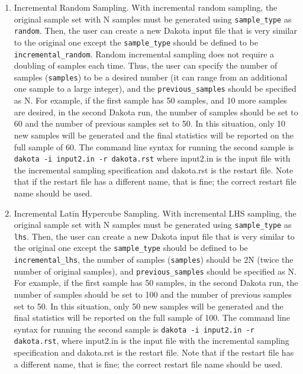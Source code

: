 \begin{enumerate}

\item Incremental Random Sampling. With incremental random sampling, 
the original sample set with N samples must be 
generated using \texttt{sample\_type} as \texttt{random}.
Then, the user can create a new Dakota input file that is very similar to the 
original one except the \texttt{sample\_type} should be defined to be 
\texttt{incremental\_random}. Random incremental sampling does not 
require a doubling of samples each time. Thus, the user 
can specify the number of samples (\texttt{samples}) to be a desired 
number (it can range from an additional one sample to a large integer), 
and the \texttt{previous\_samples} should be specified as N. For example, if
the first sample has 50 samples, and 10 more samples are desired, 
in the second Dakota run, the number
of samples should be set to 60 and the number of previous samples set
to 50. In this situation, only 10 new samples will be generated and
the final statistics will be reported on the full sample of 60. The
command line syntax for running the second sample is \texttt{dakota -i
input2.in -r dakota.rst} where input2.in is the input file with the
incremental sampling specification and dakota.rst is the restart file.
Note that if the restart file has a different name, that is fine; the
correct restart file name should be used.

\item Incremental Latin Hypercube Sampling. With incremental LHS sampling, 
the original sample set with N samples must be 
generated using \texttt{sample\_type} as \texttt{lhs}.
Then, the user can create a new Dakota input file that is very similar to the 
original one except the \texttt{sample\_type} should be defined to be 
\texttt{incremental\_lhs}, the number of samples (\texttt{samples}) should 
be 2N (twice the number of original samples), and
\texttt{previous\_samples} should be specified as N. For example, if
the first sample has 50 samples, in the second Dakota run, the number
of samples should be set to 100 and the number of previous samples set
to 50. In this situation, only 50 new samples will be generated and
the final statistics will be reported on the full sample of 100. The
command line syntax for running the second sample is \texttt{dakota -i
input2.in -r dakota.rst}, where input2.in is the input file with the
incremental sampling specification and dakota.rst is the restart file.
Note that if the restart file has a different name, that is fine; the
correct restart file name should be used.

\end{enumerate}


